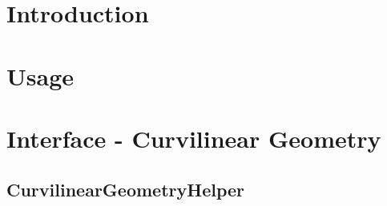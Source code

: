 \documentclass[12pt]{report}
\begin{document}
\tableofcontents





\chapter{Introduction}












\chapter{Usage}
















\chapter{Interface - Curvilinear Geometry}



\section{CurvilinearGeometryHelper}



\end{document}
